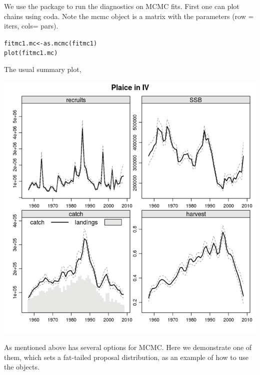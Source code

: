 \documentclass[a4paper,english,10pt]{article}\usepackage[]{graphicx}\usepackage[]{color}
\makeatletter
\newcommand{\hlstd}[1]{\textcolor[rgb]{0.196,0.196,0.196}{#1}}%
\newcommand{\hlkwb}[1]{\textcolor[rgb]{0.627,0,0.314}{#1}}%
\newcommand{\hlkwd}[1]{\textcolor[rgb]{0.78,0.227,0.412}{#1}}%
\newenvironment{kframe}{%
 \def\at@end@of@kframe{}%
 \ifinner\ifhmode%
  \def\at@end@of@kframe{\end{minipage}}%
  \begin{minipage}{\columnwidth}%
 \fi\fi%
 \def\FrameCommand##1{\hskip\@totalleftmargin \hskip-\fboxsep
 \colorbox{shadecolor}{##1}\hskip-\fboxsep
     \hskip-\linewidth \hskip-\@totalleftmargin \hskip\columnwidth}%
 \MakeFramed {\advance\hsize-\width
   \@totalleftmargin\z@ \linewidth\hsize
   \@setminipage}}%
 {\par\unskip\endMakeFramed%
 \at@end@of@kframe}
\newenvironment{knitrout}{}{} %
\makeatother
\begin{document}
We use the package  to run the diagnostics on MCMC fits. First one can plot chains using coda. Note the mcmc object is a matrix with the parameters (row = iters, cols= pars).

\begin{knitrout}
\color{fgcolor}\begin{kframe}
\begin{alltt}
\hlstd{fitmc1.mc} \hlkwb{<-} \hlkwd{as.mcmc}\hlstd{(fitmc1)}
\hlkwd{plot}\hlstd{(fitmc1.mc)}
\end{alltt}
\end{kframe}
\end{knitrout}

The usual summary plot,

\begin{knitrout}
\color{fgcolor}

{\centering \includegraphics[width=.9\linewidth]{figure/unnamed-chunk-34-1} 

}



\end{knitrout}

As mentioned above  has several options for MCMC. Here we demonstrate one of them,  which sets a fat-tailed proposal distribution, as an example of how to use the  objects.
\end{document}
